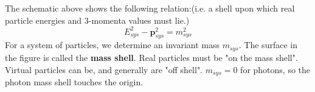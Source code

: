 \begin{center}

\end{center}
The schematic above shows the following relation:(i.e. a shell upon which real particle energies and 3-momenta values must lie.)
\begin{equation}
E_{s y s}^{2}-\mathbf{p}_{s y s}^{2}=m_{s y s}^{2}
\end{equation}
For a system of particles, we determine an invariant mass $m_{sys}$. The surface in the figure is called the \textbf{mass shell}. Real particles must be "on the mass shell". Virtual particles can be, and generally are "off shell". $m_{sys}=0$ for photons, so the photon mass shell touches the origin.

